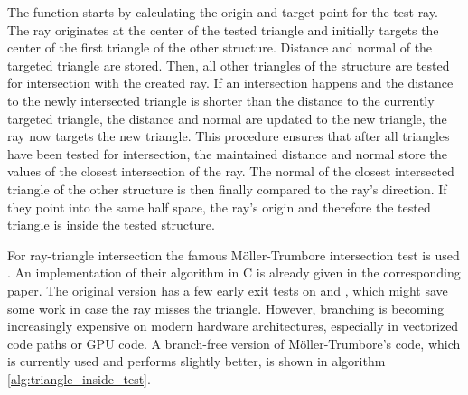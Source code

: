 %
The function starts by calculating the origin and target point for the test ray.
The ray originates at the center of the tested triangle and initially targets the center of the first triangle of the other structure.
Distance and normal of the targeted triangle are stored.
Then, all other triangles of the structure are tested for intersection with the created ray.
If an intersection happens and the distance to the newly intersected triangle is shorter than the distance to the currently targeted triangle, the distance and normal are updated to the new triangle, \ie the ray now targets the new triangle.
This procedure ensures that after all triangles have been tested for intersection, the maintained distance and normal store the values of the closest intersection of the ray.
The normal of the closest intersected triangle of the other structure is then finally compared to the ray's direction.
If they point into the same half space, the ray's origin and therefore the tested triangle is inside the tested structure.

For ray-triangle intersection the famous Möller-Trumbore intersection test is used \cite{ray_triangle_intersection_moller}.
An implementation of their algorithm in C is already given in the corresponding paper.
The original version has a few early exit tests on  and , which might save some work in case the ray misses the triangle.
However, branching is becoming increasingly expensive on modern hardware architectures, especially in vectorized code paths or GPU code.
A branch-free version of Möller-Trumbore's code, which is currently used and performs slightly better, is shown in algorithm \ref{alg:triangle_inside_test}.

